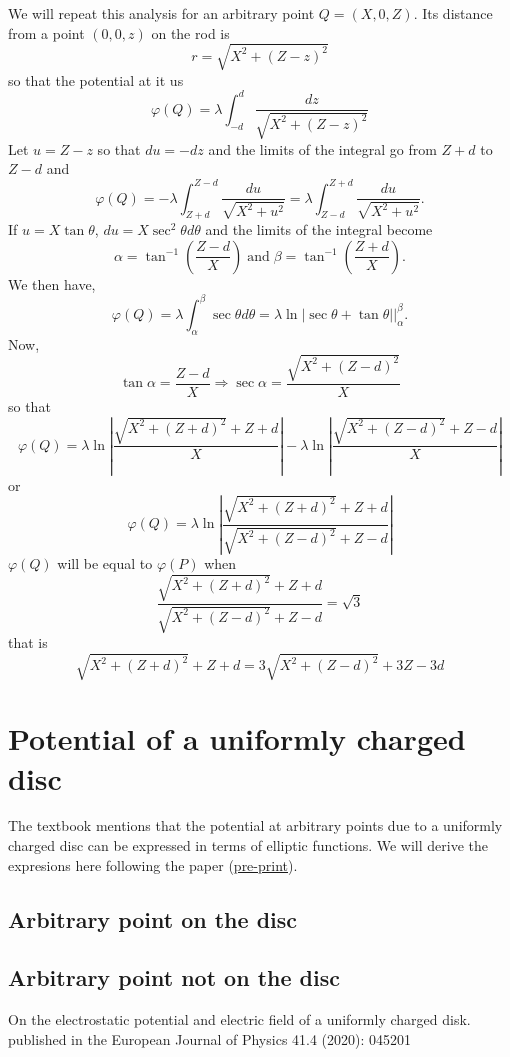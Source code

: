 \documentclass{article}
\begin{document}
\begin{enumerate}
We will repeat this analysis for an arbitrary point $Q = (X, 0, Z)$. Its distance 
from a point $(0, 0, z)$ on the rod is
\begin{equation}\label{e25}
r = \sqrt{X^2 + (Z - z)^2}
\end{equation}
so that the potential at it us
\[
\varphi(Q) = \lambda\int_{-d}^d\frac{dz}{\sqrt{X^2 + (Z - z)^2}}
\]
Let $u = Z - z$ so that $du = -dz$ and the limits of the integral go from
$Z + d$ to $Z - d$ and
\[
\varphi(Q) = -\lambda\int_{Z+d}^{Z-d}\frac{du}{\sqrt{X^2 + u^2}} = 
\lambda\int_{Z-d}^{Z+d}\frac{du}{\sqrt{X^2 + u^2}}.
\]
If $u = X\tan\theta$, $du = X\sec^2\theta d\theta$ and the limits of the
integral become 
\[
\alpha = \tan^{-1}\left(\frac{Z - d}{X}\right) \;\text{and}\;
\beta = \tan^{-1}\left(\frac{Z + d}{X}\right).
\]
We then have,
\[
\varphi(Q) = \lambda\int_\alpha^\beta \sec\theta d\theta = 
\lambda\ln|\sec\theta + \tan\theta|\Big|_\alpha^\beta.
\]
Now,
\[
\tan\alpha = \frac{Z-d}{X} \Rightarrow \sec\alpha=\frac{\sqrt{X^2 + (Z-d)^2}}{X}
\]
so that
\[
\varphi(Q) = \lambda\ln\left|\frac{\sqrt{X^2 + (Z+d)^2} + Z+d}{X}\right| - 
\lambda\ln\left|\frac{\sqrt{X^2 + (Z-d)^2} + Z-d}{X}\right|
\]
or
\begin{equation}\label{e26}
\varphi(Q) = \lambda\ln\left|\frac{\sqrt{X^2 + (Z+d)^2} + Z+d}{\sqrt{X^2 + (Z-d)^2} + Z-d}\right|
\end{equation}
$\varphi(Q)$ will be equal to $\varphi(P)$ when
\[
\frac{\sqrt{X^2 + (Z+d)^2} + Z+d}{\sqrt{X^2 + (Z-d)^2} + Z-d} = \sqrt{3}
\]
that is
\[
\sqrt{X^2 + (Z+d)^2} + Z+d = 3\sqrt{X^2 + (Z-d)^2} + 3Z-3d
\]
\end{enumerate}

\section{Potential of a uniformly charged disc}
The textbook mentions that the potential at arbitrary points due to a uniformly
charged disc can be expressed in terms of elliptic functions. We will derive the
expresions here following the paper (\href{https://arxiv.org/pdf/2004.04540}{pre-print})\cite{bs}.
\subsection{Arbitrary point on the disc}
\subsection{Arbitrary point not on the disc}

\begin{thebibliography}{1}
 On the electrostatic potential and electric field of a uniformly charged disk.
published in the European Journal of Physics 41.4 (2020): 045201
\end{thebibliography}
\end{document}
